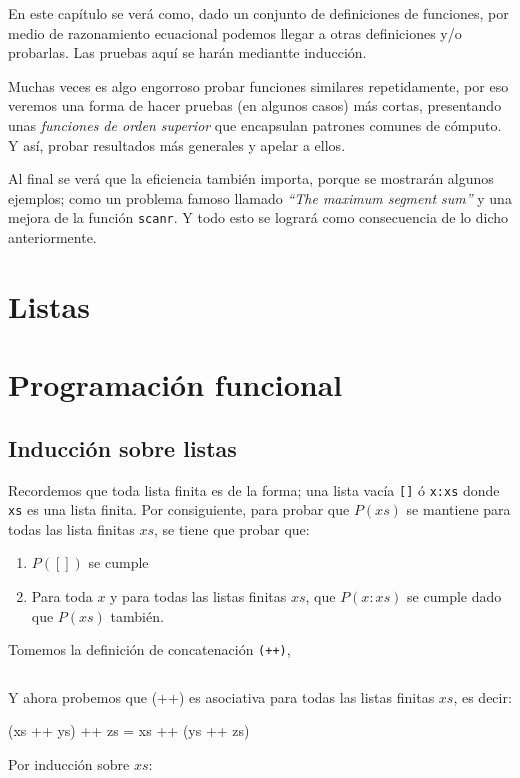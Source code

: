 En este capítulo se verá como, dado un conjunto de definiciones de funciones, por medio de razonamiento ecuacional podemos llegar a otras definiciones y/o probarlas. Las pruebas aquí se harán mediantte inducción.

Muchas veces es algo engorroso probar funciones similares repetidamente, por eso veremos una forma de hacer pruebas (en algunos casos) más cortas,
presentando unas \textit{funciones de orden superior} que encapsulan patrones comunes de cómputo. Y así, probar resultados más generales y apelar a ellos.

Al final se verá que la eficiencia también importa, porque se mostrarán algunos ejemplos; como un problema famoso llamado \textit{``The maximum segment sum''}
y una mejora de la función \texttt{scanr}. Y todo esto se logrará como consecuencia de lo dicho anteriormente.

\section{Listas}

\section{Programación funcional}


\subsection{Inducción sobre listas}
Recordemos que toda lista finita es de la forma; una lista vacía \texttt{[]} ó \texttt{x:xs} donde \texttt{xs} es una lista finita. Por consiguiente, para probar que $P(xs)$ se mantiene para todas las lista finitas $xs$,
se tiene que probar que:

\begin{enumerate}
    \item $P([])$ se cumple
    \item Para toda $x$ y para todas las listas finitas $xs$, que $P(x:xs)$ se cumple dado que $P(xs)$ también.
\end{enumerate}

Tomemos la definición de concatenación \texttt{(++)},
\inputminted{haskell}{definiciones/concatenation.hs}

Y ahora probemos que (++) es asociativa para todas las listas finitas $xs$, es decir:

(xs ++ ys) ++ zs = xs ++ (ys ++ zs)

Por inducción sobre $xs$:

